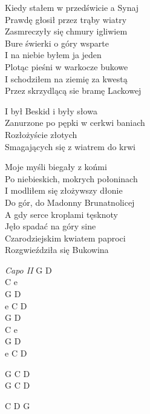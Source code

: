 
\begin{text}
    \ifchorded{\hfill\break}
    Kiedy stałem w przedświcie a Synaj\\
    Prawdę głosił przez trąby wiatry\\
    Zasmreczyły się chmury igliwiem\\
    Bure świerki o góry wsparte\\
    I na niebie byłem ja jeden\\
    Plotąc pieśni w warkocze bukowe\\
    I schodziłem na ziemię za kwestą\\
    Przez skrzydlącą sie bramę Lackowej

    \vin I był Beskid i były słowa\\
    \vin Zanurzone po pępki w cerkwi baniach\\
    \vin Rozłożyście złotych\\
    \vin Smagających się z wiatrem do krwi

    Moje myśli biegały z końmi\\
    Po niebieskich, mokrych połoninach\\
    I modliłem się złożywszy dłonie\\
    Do gór, do Madonny Brunatnolicej\\
    A gdy serce kroplami tęsknoty\\
    Jęło spadać na góry sine\\
    Czarodziejskim kwiatem paproci\\
    Rozgwieździła się Bukowina
\end{text}
\begin{chord}
    \textit{Capo II}
    G D\\
    C e\\
    G D\\
    e C D\\
    G D\\
    C e\\
    G D\\
    e C D

    G C D\\
    G C D

    C D G
\end{chord}